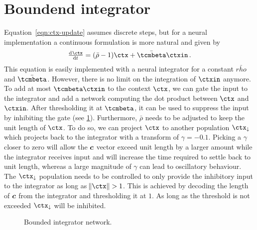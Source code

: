 \section{Boundend integrator}
Equation~\ref{eqn:ctx-update} assumes discrete steps, but for a neural implementation a continuous formulation is more natural and given by
\begin{equation}
    \od{\ctx}{t} = (\bar{\rho} - 1) \ctx + \bar{\tcmbeta} \ctxin\,\text{.}
\end{equation}
This equation is easily implemented with a neural integrator for a constant $\bar{rho}$ and $\bar{\tcmbeta}$.
However, there is no limit on the integration of $\ctxin$ anymore.
To add at most $\tcmbeta \ctxin$ to the context $\ctx$, we can gate the input to the integrator and add a network computing the dot product between $\ctx$ and $\ctxin$.
After thresholding it at $\tcmbeta$, it can be used to suppress the input by inhibiting the gate (see \cref{fig:ctx-bounded-integrator}).
Furthermore, $\bar{\rho}$ needs to be adjusted to keep the unit length of $\ctx$.
To do so, we can project $\ctx$ to another population $\ctx_{\downarrow}$ which projects back to the integrator with a transform of $\gamma = -0.1$.
Picking a $\gamma$ closer to zero will allow the $\bm{c}$ vector exceed unit length by a larger amount while the integrator receives input and will increase the time required to settle back to unit length, whereas a large magnitude of $\gamma$ can lead to oscillatory behaviour.
The $\ctx_{\downarrow}$ population needs to be controlled to only provide the inhibitory input to the integrator as long as $\norm{\ctx} > 1$.
This is achieved by decoding the length of $\bm{c}$ from the integrator and thresholding it at $1$.
As long as the threshold is not exceeded $\ctx_{\downarrow}$ will be inhibited.
\begin{figure}
    \centering
    \caption{Bounded integrator network.}\label{fig:ctx-bounded-integrator}
\end{figure}

